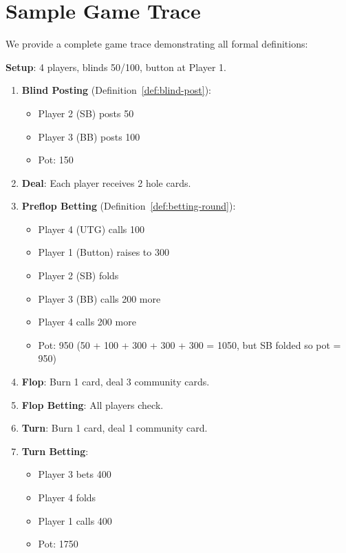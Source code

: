 \documentclass[11pt,a4paper]{article}
\begin{document}
\section{Sample Game Trace}

We provide a complete game trace demonstrating all formal definitions:

\textbf{Setup}: 4 players, blinds 50/100, button at Player 1.

\begin{enumerate}
    \item \textbf{Blind Posting} (Definition~\ref{def:blind-post}):
    \begin{itemize}
        \item Player 2 (SB) posts 50
        \item Player 3 (BB) posts 100
        \item Pot: 150
    \end{itemize}

    \item \textbf{Deal}: Each player receives 2 hole cards.

    \item \textbf{Preflop Betting} (Definition~\ref{def:betting-round}):
    \begin{itemize}
        \item Player 4 (UTG) calls 100
        \item Player 1 (Button) raises to 300
        \item Player 2 (SB) folds
        \item Player 3 (BB) calls 200 more
        \item Player 4 calls 200 more
        \item Pot: 950 (50 + 100 + 300 + 300 + 300 = 1050, but SB folded so pot = 950)
    \end{itemize}

    \item \textbf{Flop}: Burn 1 card, deal 3 community cards.

    \item \textbf{Flop Betting}: All players check.

    \item \textbf{Turn}: Burn 1 card, deal 1 community card.

    \item \textbf{Turn Betting}:
    \begin{itemize}
        \item Player 3 bets 400
        \item Player 4 folds
        \item Player 1 calls 400
        \item Pot: 1750
    \end{itemize}


\end{enumerate}
\end{document}
